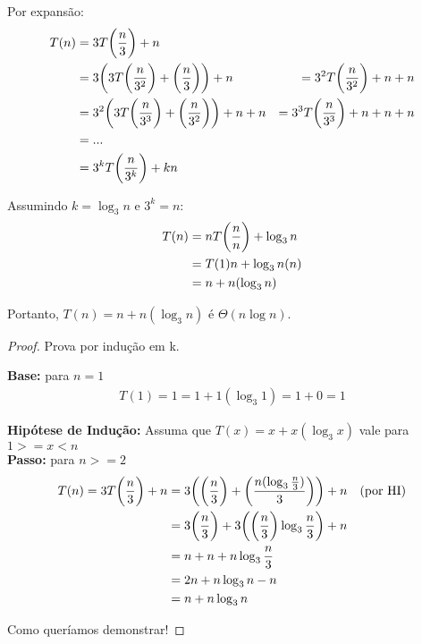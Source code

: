 Por expansão:\\
\begin{align*}
T(n) & = 3T\bigg(\dfrac{n}{3}\bigg) + n\\
&= 3 \bigg( 3T\bigg(\dfrac{n}{3^2}\bigg) + \bigg(\dfrac{n}{3}\bigg) \bigg) + n &= 3^2T\bigg(\dfrac{n}{3^2}\bigg) + n + n\\
&= 3^2 \bigg( 3T\bigg(\dfrac{n}{3^3}\bigg) + \bigg(\dfrac{n}{3^2}\bigg) \bigg) + n + n &= 3^3T\bigg(\dfrac{n}{3^3}\bigg) + n + n + n\\
&= ... \\
&= 3^kT\bigg(\dfrac{n}{3^k}\bigg) + kn
\end{align*}

Assumindo $k = \log_3{n}$ e $3^k = n$:\\
\begin{align*}
T(n) &= nT\bigg(\dfrac{n}{n}\bigg) + \log_3{n}\\
&= T(1)n + \log_3{n}(n)\\
&= n + n(\log_3{n})\\
\end{align*}

Portanto, $T(n) = n + n(\log_3{n})$ é $\Theta(n\log{n})$.

\begin{proof}
Prova por indução em k.

\textbf{Base:} para $n = 1$
\begin{align*}
T(1) = 1 = 1 + 1(\log_3{1}) = 1+ 0 = 1
\end{align*}

\textbf{Hipótese de Indução:} Assuma que $T(x) = x + x(\log_3{x})$ vale para $1 >= x < n$\\

\textbf{Passo:} para $n >= 2$
\begin{align*}
T(n) = 3T\bigg(\dfrac{n}{3}\bigg) + n &= 3\bigg( \bigg(\dfrac{n}{3}\bigg) + \bigg(\dfrac{n(\log_3{\frac{n}{3}})}{3}\bigg) \bigg) + n & (\text{por HI})\\
&= 3\bigg(\dfrac{n}{3}\bigg) + 3\bigg( \bigg(\dfrac{n}{3}\bigg)\log_3{\frac{n}{3}}\bigg) + n\\
&= n + n + n\log_3{\frac{n}{3}}\\
&= 2n + n\log_3{n} - n\\
&= n + n\log_3{n}
\end{align*}

Como queríamos demonstrar!

\end{proof}